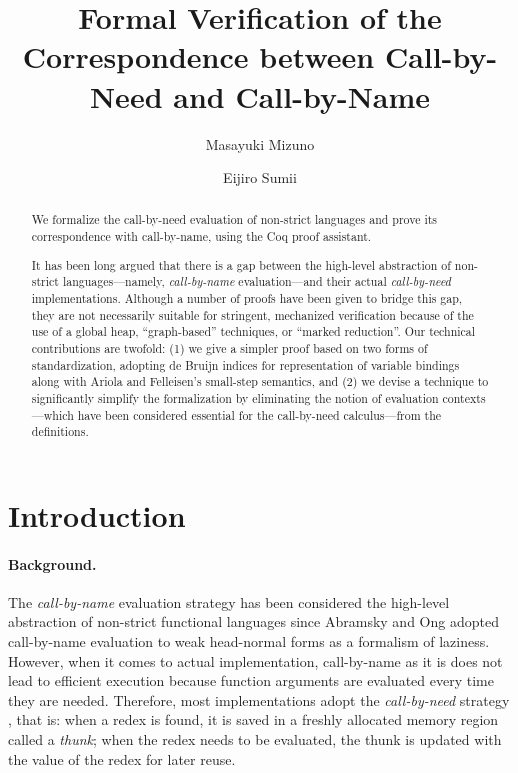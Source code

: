 \documentclass{llncs}
\begin{document}
\title{Formal Verification of the Correspondence between Call-by-Need and Call-by-Name}

\author{Masayuki Mizuno \and Eijiro Sumii}


\maketitle
%
\begin{abstract}
We formalize the call-by-need evaluation of non-strict languages and prove
its correspondence with call-by-name, using the Coq proof assistant.

\quad It has been long argued that there is a gap between the high-level
abstraction of non-strict languages---namely, \emph{call-by-name} evaluation---and
their actual \emph{call-by-need} implementations.
Although a number of proofs have been given to bridge this gap,
they are not necessarily suitable for stringent, mechanized verification
because of the use of a global heap, ``graph-based'' techniques,
or ``marked reduction''.
Our technical contributions are twofold:
(1) we give a simpler proof based on two forms of standardization,
adopting de Bruijn indices for representation of variable bindings
along with Ariola and Felleisen's small-step semantics, and
(2) we devise a technique to significantly simplify the formalization
by eliminating the notion of evaluation contexts---which have been considered
essential for the call-by-need calculus---from the definitions.
\end{abstract}
%
\section{Introduction}
\paragraph*{Background.}
The \emph{call-by-name} evaluation strategy has been considered the high-level abstraction of non-strict functional languages
since Abramsky \cite{Abramsky90} and Ong \cite{Ong88} adopted call-by-name evaluation to weak head-normal forms as a formalism of laziness.
However, when it comes to actual implementation, call-by-name as it is does not lead to efficient execution because function arguments are evaluated every time they are needed.
Therefore, most implementations adopt the \emph{call-by-need} strategy \cite{Wadsworth71}, that is: when a redex is found, it is saved in a freshly allocated memory region called a \emph{thunk}; when the redex needs to be evaluated, the thunk is updated with the value of the redex for later reuse.
\end{document}
